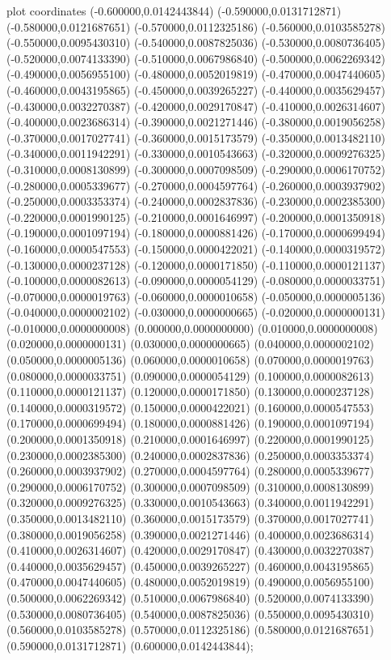  plot coordinates {(-0.600000,0.0142443844) (-0.590000,0.0131712871) (-0.580000,0.0121687651) (-0.570000,0.0112325186) (-0.560000,0.0103585278) (-0.550000,0.0095430310) (-0.540000,0.0087825036) (-0.530000,0.0080736405) (-0.520000,0.0074133390) (-0.510000,0.0067986840) (-0.500000,0.0062269342) (-0.490000,0.0056955100) (-0.480000,0.0052019819) (-0.470000,0.0047440605) (-0.460000,0.0043195865) (-0.450000,0.0039265227) (-0.440000,0.0035629457) (-0.430000,0.0032270387) (-0.420000,0.0029170847) (-0.410000,0.0026314607) (-0.400000,0.0023686314) (-0.390000,0.0021271446) (-0.380000,0.0019056258) (-0.370000,0.0017027741) (-0.360000,0.0015173579) (-0.350000,0.0013482110) (-0.340000,0.0011942291) (-0.330000,0.0010543663) (-0.320000,0.0009276325) (-0.310000,0.0008130899) (-0.300000,0.0007098509) (-0.290000,0.0006170752) (-0.280000,0.0005339677) (-0.270000,0.0004597764) (-0.260000,0.0003937902) (-0.250000,0.0003353374) (-0.240000,0.0002837836) (-0.230000,0.0002385300) (-0.220000,0.0001990125) (-0.210000,0.0001646997) (-0.200000,0.0001350918) (-0.190000,0.0001097194) (-0.180000,0.0000881426) (-0.170000,0.0000699494) (-0.160000,0.0000547553) (-0.150000,0.0000422021) (-0.140000,0.0000319572) (-0.130000,0.0000237128) (-0.120000,0.0000171850) (-0.110000,0.0000121137) (-0.100000,0.0000082613) (-0.090000,0.0000054129) (-0.080000,0.0000033751) (-0.070000,0.0000019763) (-0.060000,0.0000010658) (-0.050000,0.0000005136) (-0.040000,0.0000002102) (-0.030000,0.0000000665) (-0.020000,0.0000000131) (-0.010000,0.0000000008) (0.000000,0.0000000000) (0.010000,0.0000000008) (0.020000,0.0000000131) (0.030000,0.0000000665) (0.040000,0.0000002102) (0.050000,0.0000005136) (0.060000,0.0000010658) (0.070000,0.0000019763) (0.080000,0.0000033751) (0.090000,0.0000054129) (0.100000,0.0000082613) (0.110000,0.0000121137) (0.120000,0.0000171850) (0.130000,0.0000237128) (0.140000,0.0000319572) (0.150000,0.0000422021) (0.160000,0.0000547553) (0.170000,0.0000699494) (0.180000,0.0000881426) (0.190000,0.0001097194) (0.200000,0.0001350918) (0.210000,0.0001646997) (0.220000,0.0001990125) (0.230000,0.0002385300) (0.240000,0.0002837836) (0.250000,0.0003353374) (0.260000,0.0003937902) (0.270000,0.0004597764) (0.280000,0.0005339677) (0.290000,0.0006170752) (0.300000,0.0007098509) (0.310000,0.0008130899) (0.320000,0.0009276325) (0.330000,0.0010543663) (0.340000,0.0011942291) (0.350000,0.0013482110) (0.360000,0.0015173579) (0.370000,0.0017027741) (0.380000,0.0019056258) (0.390000,0.0021271446) (0.400000,0.0023686314) (0.410000,0.0026314607) (0.420000,0.0029170847) (0.430000,0.0032270387) (0.440000,0.0035629457) (0.450000,0.0039265227) (0.460000,0.0043195865) (0.470000,0.0047440605) (0.480000,0.0052019819) (0.490000,0.0056955100) (0.500000,0.0062269342) (0.510000,0.0067986840) (0.520000,0.0074133390) (0.530000,0.0080736405) (0.540000,0.0087825036) (0.550000,0.0095430310) (0.560000,0.0103585278) (0.570000,0.0112325186) (0.580000,0.0121687651) (0.590000,0.0131712871) (0.600000,0.0142443844)};
